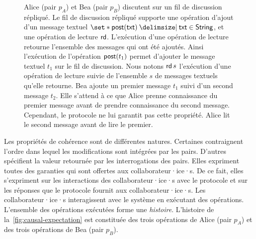 
\begin{figure}[htb]
\centering
{}
\caption[Attentes des collaborateur·ice·s]{Alice (pair $p_A$) et Bea (pair $p_B$) discutent sur un fil de discussion répliqué.
Le fil de discussion répliqué supporte une opération d'ajout d'un message textuel $\set*{\trm{post}(\trm{txt}) \given \trm{txt} \in \trm{String} }$, et une opération de lecture $\operatorname{\mathsf{rd}}$.
L'exécution d'une opération de lecture retourne l'ensemble des messages qui ont été ajoutés.
Ainsi l'exécution de l'opération $\operatorname{\mathsf{post}}(t_1)$ permet d'ajouter le message textuel $t_1$ sur le fil de discussion.
Nous notons $\operatorname{\mathsf{rd}} s$ l'exécution d'une opération de lecture suivie de l'ensemble $s$ de messages textuels qu'elle retourne.
Bea ajoute un premier message $t_1$ suivi d'un second message $t_2$.
Elle s'attend à ce que Alice prenne connaissance du premier message avant de prendre connaissance du second message.
Cependant, le protocole ne lui garantit pas cette propriété.
Alice lit le second message avant de lire le premier.}\label{fig:causal-expectation}
\end{figure}

Les propriétés de cohérence sont de différentes natures.
Certaines contraignent l'ordre dans lequel les modifications sont intégrées par les pairs.
D'autres spécifient la valeur retournée par les interrogations des pairs.
Elles expriment toutes des garanties qui sont offertes aux collaborateur·ice·s.
De ce fait, elles s'expriment sur les interactions des collaborateur·ice·s avec le protocole et sur les réponses que le protocole fournit aux collaborateur·ice·s.
Les collaborateur·ice·s interagissent avec le système en exécutant des opérations.
L'ensemble des opérations exécutées forme une \emph{histoire}.
L'histoire de la~\autoref{fig:causal-expectation} est constituée des trois opérations de Alice (pair $p_A$) et des trois opérations de Bea (pair $p_B$).

